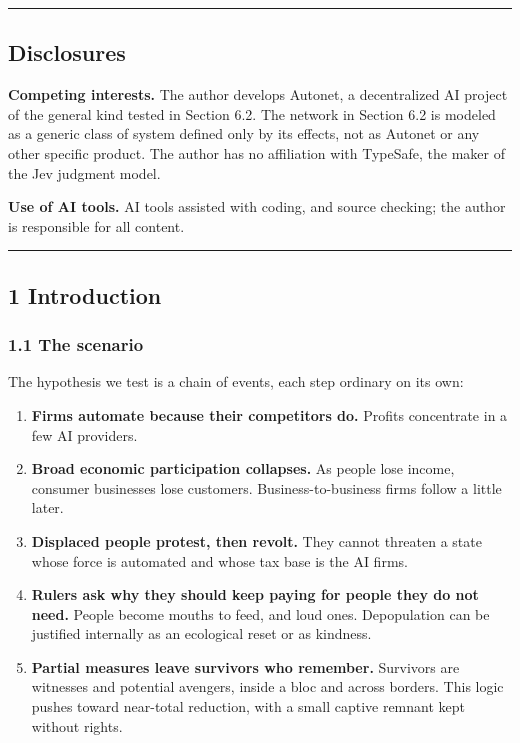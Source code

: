 \documentclass[
  10pt,
]{article}
\providecommand{\tightlist}{%
  \setlength{\itemsep}{0pt}\setlength{\parskip}{0pt}}
\begin{document}
\begin{center}\rule{0.5\linewidth}{0.5pt}\end{center}

\subsection{Disclosures}\label{disclosures}

\textbf{Competing interests.} The author develops Autonet, a decentralized AI project of the general
kind tested in Section 6.2. The network in Section 6.2 is modeled as a generic class of system
defined only by its effects, not as Autonet or any other specific product. The author has no
affiliation with TypeSafe, the maker of the Jev judgment model.

\textbf{Use of AI tools.} AI tools assisted with coding, and source checking; the author is
responsible for all content.

\begin{center}\rule{0.5\linewidth}{0.5pt}\end{center}

\subsection{1 Introduction}\label{introduction}

\subsubsection{1.1 The scenario}\label{the-scenario}

The hypothesis we test is a chain of events, each step ordinary on its own:

\begin{enumerate}
\def\labelenumi{\arabic{enumi}.}
\tightlist
\item
  \textbf{Firms automate because their competitors do.} Profits concentrate in a few AI providers.
\item
  \textbf{Broad economic participation collapses.} As people lose income, consumer businesses lose
  customers. Business-to-business firms follow a little later.
\item
  \textbf{Displaced people protest, then revolt.} They cannot threaten a state whose force is
  automated and whose tax base is the AI firms.
\item
  \textbf{Rulers ask why they should keep paying for people they do not need.} People become mouths
  to feed, and loud ones. Depopulation can be justified internally as an ecological reset or as
  kindness.
\item
  \textbf{Partial measures leave survivors who remember.} Survivors are witnesses and potential
  avengers, inside a bloc and across borders. This logic pushes toward near-total reduction, with a
  small captive remnant kept without rights.
\end{enumerate}
\end{document}
